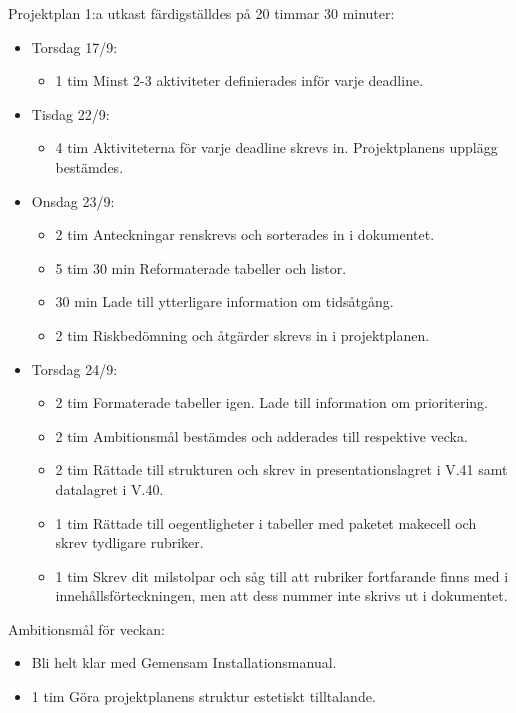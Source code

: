 \documentclass{TDP003mall}
\begin{document}
  Projektplan 1:a utkast färdigställdes på 20 timmar 30 minuter:
\begin{itemize}
  \item Torsdag 17/9:
  \begin{itemize}
    \item 1 tim Minst 2-3 aktiviteter definierades inför varje deadline.
  \end{itemize}
  \item Tisdag 22/9:
  \begin{itemize}
    \item 4 tim Aktiviteterna för varje deadline skrevs in. Projektplanens upplägg bestämdes.
  \end{itemize}
  \item Onsdag 23/9:
  \begin{itemize}
    \item 2 tim Anteckningar renskrevs och sorterades in i dokumentet.
    \item 5 tim 30 min Reformaterade tabeller och listor.
    \item 30 min Lade till ytterligare information om tidsåtgång.
    \item 2 tim Riskbedömning och åtgärder skrevs in i projektplanen.
  \end{itemize}
  \item Torsdag 24/9:
  \begin{itemize}
    \item 2 tim Formaterade tabeller igen. Lade till information om prioritering.
    \item 2 tim Ambitionsmål bestämdes och adderades till respektive vecka.
    \item 2 tim Rättade till strukturen och skrev in presentationslagret i V.41 samt datalagret i V.40.
    \item 1 tim Rättade till oegentligheter i tabeller med paketet makecell och skrev tydligare rubriker.
    \item 1 tim Skrev dit milstolpar och såg till att rubriker fortfarande finns med i innehållsförteckningen, men att dess nummer inte skrivs ut i dokumentet.
  \end{itemize}
\end{itemize}

Ambitionsmål för veckan:
\begin{itemize}
\item Bli helt klar med Gemensam Installationsmanual.
  \item 1 tim Göra projektplanens struktur estetiskt tilltalande.
  \end{itemize}
\end{document}
